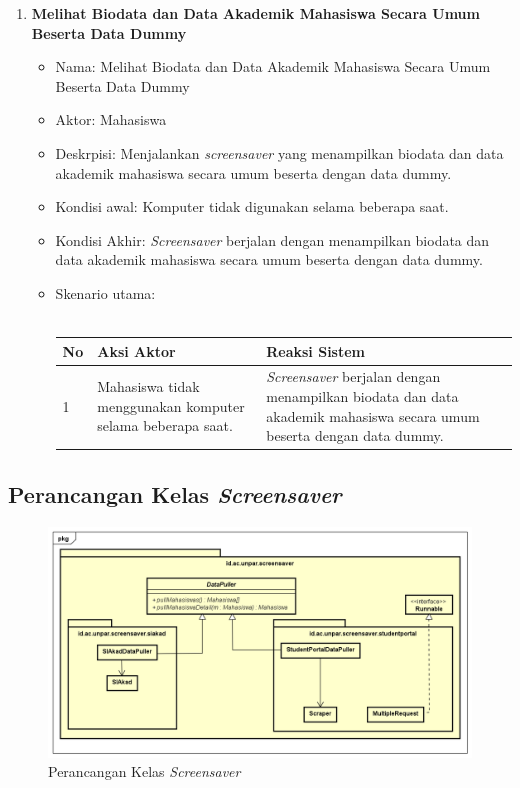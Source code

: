 \begin{enumerate}
	\item \textbf{Melihat Biodata dan Data Akademik Mahasiswa Secara Umum Beserta Data Dummy}
	\begin{itemize}
		\item Nama: Melihat Biodata dan Data Akademik Mahasiswa Secara Umum Beserta Data Dummy
		\item Aktor: Mahasiswa
		\item Deskrpisi: Menjalankan \textit{screensaver} yang menampilkan biodata dan data akademik mahasiswa secara umum beserta dengan data dummy.
		\item Kondisi awal: Komputer tidak digunakan selama beberapa saat.
		\item Kondisi Akhir: \textit{Screensaver} berjalan dengan menampilkan biodata dan data akademik mahasiswa secara umum beserta dengan data dummy.
		\item Skenario utama: \\ \\
			\begin{tabular}{|p{0.5cm} |p{6cm}| p{6cm}|}
				\hline
				No 	& Aksi Aktor & Reaksi Sistem \\ \hline
				1 	& Mahasiswa tidak menggunakan komputer selama beberapa saat. 	&	\textit{Screensaver} berjalan dengan menampilkan biodata dan data akademik mahasiswa secara umum beserta dengan data dummy. \\ \hline 
			\end{tabular}
	\end{itemize}
\end{enumerate}


\subsection{Perancangan Kelas \textit{Screensaver}}

\begin{figure}[H]
	\centering
	\includegraphics[scale=0.45]{Gambar/ClassDiagramAwal.png}
	\caption{Perancangan Kelas \textit{Screensaver}}
	\label{fig:3_diagram_kelas_awal}
\end{figure}


